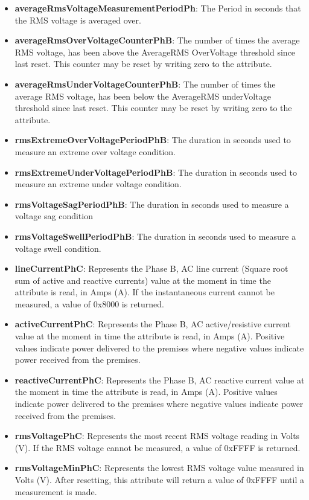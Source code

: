 \begin{itemize}
\item \textbf{averageRmsVoltageMeasurementPeriodPh}: The Period in seconds that the RMS voltage is averaged over.
\item \textbf{averageRmsOverVoltageCounterPhB}: The number of times the average RMS voltage, has been above the AverageRMS OverVoltage threshold since last reset. This counter may be reset by writing zero to the attribute.
\item \textbf{averageRmsUnderVoltageCounterPhB}: The number of times the average RMS voltage, has been below the AverageRMS underVoltage threshold since last reset. This counter may be reset by writing zero to the attribute.
\item \textbf{rmsExtremeOverVoltagePeriodPhB}: The duration in seconds used to measure an extreme over voltage condition.
\item \textbf{rmsExtremeUnderVoltagePeriodPhB}: The duration in seconds used to measure an extreme under voltage condition.
\item \textbf{rmsVoltageSagPeriodPhB}: The duration in seconds used to measure a voltage sag condition
\item \textbf{rmsVoltageSwellPeriodPhB}: The duration in seconds used to measure a voltage swell condition.
\item \textbf{lineCurrentPhC}: Represents the Phase B, AC line current (Square root sum of active and reactive currents) value at the moment in time the attribute is read, in Amps (A). If the instantaneous current cannot be measured, a value of 0x8000 is returned.
\item \textbf{activeCurrentPhC}: Represents the Phase B, AC active/resistive current value at the moment in time the attribute is read, in Amps (A). Positive values indicate power delivered to the premises where negative values indicate power received from the premises.
\item \textbf{reactiveCurrentPhC}: Represents the Phase B, AC reactive current value at the moment in time the attribute is read, in Amps (A). Positive values indicate power delivered to the premises where negative values indicate power received from the premises.
\item \textbf{rmsVoltagePhC}: Represents the most recent RMS voltage reading in Volts (V). If the RMS voltage cannot be measured, a value of 0xFFFF is returned.
\item \textbf{rmsVoltageMinPhC}: Represents the lowest RMS voltage value measured in Volts (V). After resetting, this attribute will return a value of 0xFFFF until a measurement is made.

\end{itemize}
